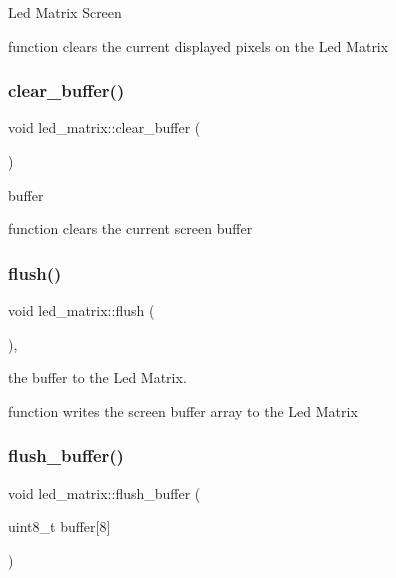 Led Matrix Screen 

function clears the current displayed pixels on the Led Matrix \mbox{\label{classled__matrix_af26ac982e5c74a357f5fe18e73b819e4}} 
\subsubsection{\texorpdfstring{clear\+\_\+buffer()}{clear\_buffer()}}
{\footnotesize\ttfamily void led\+\_\+matrix\+::clear\+\_\+buffer (\begin{DoxyParamCaption}{ }\end{DoxyParamCaption})\hspace{0.3cm}{\ttfamily [inline]}}



buffer 

function clears the current screen buffer \mbox{\label{classled__matrix_a074e1d86a05e2e67a3c329d589b601b8}} 
\subsubsection{\texorpdfstring{flush()}{flush()}}
{\footnotesize\ttfamily void led\+\_\+matrix\+::flush (\begin{DoxyParamCaption}{ }\end{DoxyParamCaption})\hspace{0.3cm}{\ttfamily [inline]}, {\ttfamily [override]}}



the buffer to the Led Matrix. 

function writes the screen buffer array to the Led Matrix \mbox{\label{classled__matrix_a0916fce5a976a46da16204265332015f}} 
\subsubsection{\texorpdfstring{flush\+\_\+buffer()}{flush\_buffer()}}
{\footnotesize\ttfamily void led\+\_\+matrix\+::flush\+\_\+buffer (\begin{DoxyParamCaption}\item[{uint8\+\_\+t}]{buffer\mbox{[}8\mbox{]} }\end{DoxyParamCaption})\hspace{0.3cm}{\ttfamily [inline]}}



